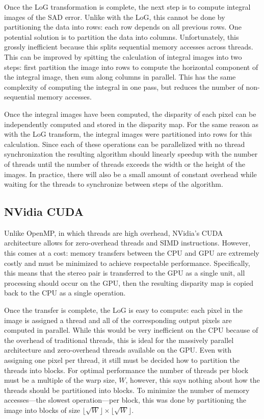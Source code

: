 \documentclass{article}
\newcommand{\floor}[1]{\lfloor#1\rfloor}
\begin{document}
Once the LoG transformation is complete, the next step is to compute integral
images of the SAD error. Unlike with the LoG, this cannot be done by
partitioning the data into rows: each row depends on all previous rows. One
potential solution is to partition the data into columns. Unfortunately, this
grossly inefficient because this splits sequential memory accesses across
threads. This can be improved by spitting the calculation of integral images
into two steps: first partition the image into rows to compute the horizontal
component of the integral image, then sum along columns in parallel. This has
the same complexity of computing the integral in one pass, but reduces the
number of non-sequential memory accesses.

Once the integral images have been computed, the disparity of each pixel can be
independently computed and stored in the disparity map. For the same reason as
with the LoG transform, the integral images were partitioned into rows for this
calculation. Since each of these operations can be parallelized with no thread
synchronization the resulting algorithm should linearly speedup with the number
of threads until the number of threads exceeds the width or the height of the
images. In practice, there will also be a small amount of constant overhead 
while waiting for the threads to synchronize between steps of the algorithm.

\subsection{NVidia CUDA}
\label{sec:parallel-cuda}
Unlike OpenMP, in which threads are high overhead, NVidia's CUDA architecture
allows for zero-overhead threads and SIMD instructions. However, this comes at
a cost: memory transfers between the CPU and GPU are extremely costly and must
be minimized to achieve respectable performance. Specifically, this means that
the stereo pair is transferred to the GPU as a single unit, all processing
should occur on the GPU, then the resulting disparity map is copied back to the
CPU as a single operation.

Once the transfer is complete, the LoG is easy to compute: each pixel in the
image is assigned a thread and all of the corresponding output pixels are
computed in parallel. While this would be very inefficient on the CPU because
of the overhead of traditional threads, this is ideal for the massively
parallel architecture and zero-overhead threads available on the GPU. Even
with assigning one pixel per thread, it still must be decided how to partition
the threads into blocks. For optimal performance the number of threads per block
must be a multiple of the warp size, $W$, however, this says nothing about how the
threads should be partitioned into blocks. To minimize the number of memory
accesses---the slowest operation---per block, this was done by partitioning the
image into blocks of size $\floor{\sqrt{W}} \times \floor{\sqrt{W}}$.
\end{document}
